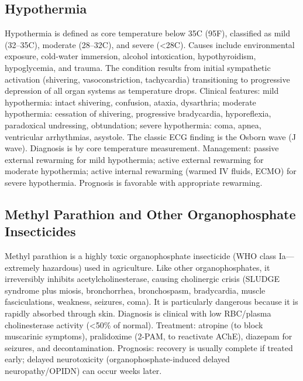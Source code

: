 \subsection{Hypothermia}
\label{sec:Hypothermia}
Hypothermia is defined as core temperature below 35\textdegree C (95\textdegree F), classified as mild (32--35\textdegree C), moderate (28--32\textdegree C), and severe (<28\textdegree C). Causes include environmental exposure, cold-water immersion, alcohol intoxication, hypothyroidism, hypoglycemia, and trauma. The condition results from initial sympathetic activation (shivering, vasoconstriction, tachycardia) transitioning to progressive depression of all organ systems as temperature drops. Clinical features: mild hypothermia: intact shivering, confusion, ataxia, dysarthria; moderate hypothermia: cessation of shivering, progressive bradycardia, hyporeflexia, paradoxical undressing, obtundation; severe hypothermia: coma, apnea, ventricular arrhythmias, asystole. The classic ECG finding is the Osborn wave (J wave). Diagnosis is by core temperature measurement. Management: passive external rewarming for mild hypothermia; active external rewarming for moderate hypothermia; active internal rewarming (warmed IV fluids, ECMO) for severe hypothermia. Prognosis is favorable with appropriate rewarming.

\subsection{Methyl Parathion and Other Organophosphate Insecticides}
\label{sec:Methyl Parathion}
Methyl parathion is a highly toxic organophosphate insecticide (WHO class Ia---extremely hazardous) used in agriculture. Like other organophosphates, it irreversibly inhibits acetylcholinesterase, causing cholinergic crisis (SLUDGE syndrome plus miosis, bronchorrhea, bronchospasm, bradycardia, muscle fasciculations, weakness, seizures, coma). It is particularly dangerous because it is rapidly absorbed through skin. Diagnosis is clinical with low RBC/plasma cholinesterase activity (<50\% of normal). Treatment: atropine (to block muscarinic symptoms), pralidoxime (2-PAM, to reactivate AChE), diazepam for seizures, and decontamination. Prognosis: recovery is usually complete if treated early; delayed neurotoxicity (organophosphate-induced delayed neuropathy/OPIDN) can occur weeks later.

